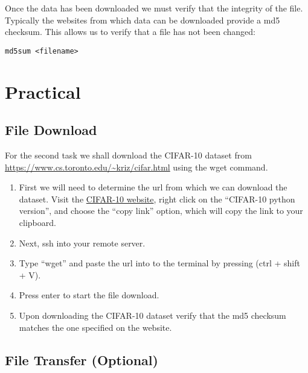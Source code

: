 \documentclass[
]{book}
\providecommand{\tightlist}{%
  \setlength{\itemsep}{0pt}\setlength{\parskip}{0pt}}
\begin{document}
Once the data has been downloaded we must verify that the integrity of the file.
Typically the websites from which data can be downloaded provide a md5 checksum.
This allows us to verify that a file has not been changed:

\begin{verbatim}
md5sum <filename>
\end{verbatim}

\hypertarget{practical}{%
\section{Practical}\label{practical}}

\hypertarget{file-download-1}{%
\subsection{File Download}\label{file-download-1}}

For the second task we shall download the CIFAR-10 dataset from
\url{https://www.cs.toronto.edu/~kriz/cifar.html}
using the wget command.

\begin{enumerate}
\def\labelenumi{\arabic{enumi})}
\tightlist
\item
  First we will need to determine the url from which we can download the dataset.
  Visit the \href{https://www.cs.toronto.edu/~kriz/cifar.html}{CIFAR-10 website}, right
  click on the ``CIFAR-10 python version'', and choose the ``copy link'' option,
  which will copy the link to your clipboard.
\item
  Next, ssh into your remote server.
\item
  Type ``wget'' and paste the url into to the terminal by pressing (ctrl + shift + V).
\item
  Press enter to start the file download.
\item
  Upon downloading the CIFAR-10 dataset verify that the md5 checksum matches the one specified on the website.
\end{enumerate}

\hypertarget{file-transfer-optional}{%
\subsection{File Transfer (Optional)}\label{file-transfer-optional}}
\end{document}
